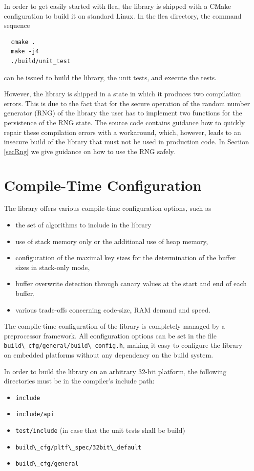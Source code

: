 \documentclass[a4paper,11pt]{scrartcl}
\begin{document}
  In order to get easily started with flea, the library is shipped with a CMake
  configuration to build it on standard Linux. In the
  flea directory, the command sequence 
  \begin{verbatim}
  cmake .
  make -j4
  ./build/unit_test
  \end{verbatim}
  can be issued to build the library, the unit tests, and execute the tests.

  However, the library is shipped in a state in which it produces two
  compilation errors. This is due to the fact that for the secure operation of
  the random number generator (RNG) of the library the user has to implement two
  functions for the persistence of the RNG state. The source code contains
  guidance how to quickly repair these compilation errors with a workaround,
  which, however, leads to an insecure build of the library that must not be
  used in production code. In Section \ref{secRng} we give guidance on how to use
  the RNG safely.

  \section{Compile-Time Configuration}

The library offers various compile-time
configuration options, such as 
\begin{itemize}
  \item the set of algorithms to include in the library
  \item use of stack memory only or the additional use of heap memory,
  \item configuration of the maximal key sizes for the determination of the
    buffer sizes in stack-only mode,
  \item buffer overwrite detection through canary values at the start and end of
    each buffer,
  \item various trade-offs concerning code-size, RAM demand and speed.
  \end{itemize}

  The compile-time configuration of the library is completely managed by a
  preprocessor framework. All configuration options can be set in the file
  \verb#build\_cfg/general/build\_config.h#, making it easy to configure the
  library on embedded platforms without any dependency on the build system.

  In order to build the library on an arbitrary 32-bit platform, the following
  directories must be in the compiler's include path:
  \begin{itemize}
    \item \verb#include#
    \item \verb#include/api#
    \item \verb#test/include# (in case that the unit tests shall be build)
    \item \verb#build\_cfg/pltf\_spec/32bit\_default#
    \item \verb#build\_cfg/general#
  \end{itemize}
\end{document}
